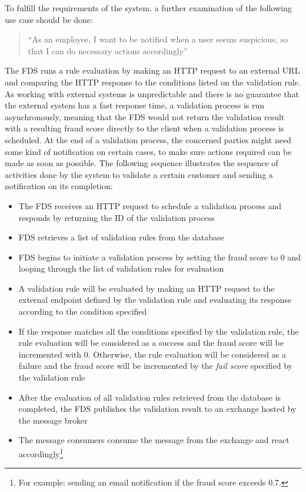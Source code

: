 To fulfill the requirements of the system, a further examination of the following use case should be done:

\begin{quotation}
 \enquote{As an employee, I want to be notified when a user seems suspicious, so that I can do necessary actions accordingly} 
\end{quotation}

The FDS runs a rule evaluation by making an HTTP request to an external URL and comparing the HTTP response to the conditions listed on the validation rule. As working with external systems is unpredictable and there is no guarantee that the external system has a fast response time, a validation process is run asynchronously, meaning that the FDS would not return the validation result with a resulting fraud score directly to the client when a validation process is scheduled. At the end of a validation process, the concerned parties might need some kind of notification on certain cases, to make sure actions required can be made as soon as possible. The following sequence illustrates the sequence of activities done by the system to validate a certain customer and sending a notification on its completion:

\begin{itemize}
 \item The FDS receives an HTTP request to schedule a validation process and responds by returning the ID of the validation process
 \item FDS retrieves a list of validation rules from the database
 \item FDS begins to initiate a validation process by setting the fraud score to 0 and looping through the list of validation rules for evaluation
 \item A validation rule will be evaluated by making an HTTP request to the external endpoint defined by the validation rule and evaluating its response according to the condition specified
 \item If the response matches all the conditions specified by the validation rule, the rule evaluation will be considered as a success and the fraud score will be incremented with 0. Otherwise, the rule evaluation will be considered as a failure and the fraud score will be incremented by the \emph{fail score} specified by the validation rule
 \item After the evaluation of all validation rules retrieved from the database is completed, the FDS publishes the validation result to an exchange hosted by the message broker
 \item The message consumers consume the message from the exchange and react accordingly\footnote{For example: sending an email notification if the fraud score exceeds 0.7.}
\end{itemize}



